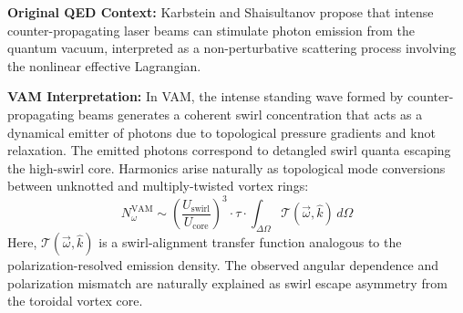 \documentclass[12pt]{article}
\begin{document}
\textbf{Original QED Context:} Karbstein and Shaisultanov propose that intense counter-propagating laser beams can stimulate photon emission from the quantum vacuum, interpreted as a non-perturbative scattering process involving the nonlinear effective Lagrangian.

\textbf{VAM Interpretation:} In VAM, the intense standing wave formed by counter-propagating beams generates a coherent swirl concentration that acts as a dynamical emitter of photons due to topological pressure gradients and knot relaxation. The emitted photons correspond to detangled swirl quanta escaping the high-swirl core. Harmonics arise naturally as topological mode conversions between unknotted and multiply-twisted vortex rings:
\begin{equation}
N_{\omega}^\text{VAM} \sim \left(\frac{U_\text{swirl}}{U_\text{core}}\right)^3 \cdot \tau \cdot \int_{\Delta \Omega} \mathcal{T}(\vec{\omega}, \hat{k}) \, d\Omega
\end{equation}
Here, $\mathcal{T}(\vec{\omega}, \hat{k})$ is a swirl-alignment transfer function analogous to the polarization-resolved emission density. The observed angular dependence and polarization mismatch are naturally explained as swirl escape asymmetry from the toroidal vortex core.
\end{document}
